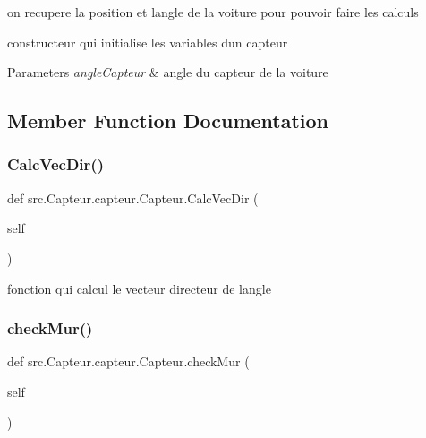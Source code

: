 on recupere la position et l\textquotesingle{}angle de la voiture pour pouvoir faire les calculs 

constructeur qui initialise les variables d\textquotesingle{}un capteur 
\begin{DoxyParams}{Parameters}
{\em angle\+Capteur} & angle du capteur de la voiture \\
\hline
\end{DoxyParams}


\subsection{Member Function Documentation}
\mbox{\label{classsrc_1_1_capteur_1_1capteur_1_1_capteur_a620b8aef4fd51d712725e22cb80c4c15}} 
\subsubsection{\texorpdfstring{Calc\+Vec\+Dir()}{CalcVecDir()}}
{\footnotesize\ttfamily def src.\+Capteur.\+capteur.\+Capteur.\+Calc\+Vec\+Dir (\begin{DoxyParamCaption}\item[{}]{self }\end{DoxyParamCaption})}



fonction qui calcul le vecteur directeur de l\textquotesingle{}angle 

\mbox{\label{classsrc_1_1_capteur_1_1capteur_1_1_capteur_a4a3d1935b2f2f78b1b95b1ea72632d88}} 
\subsubsection{\texorpdfstring{check\+Mur()}{checkMur()}}
{\footnotesize\ttfamily def src.\+Capteur.\+capteur.\+Capteur.\+check\+Mur (\begin{DoxyParamCaption}\item[{}]{self }\end{DoxyParamCaption})}



